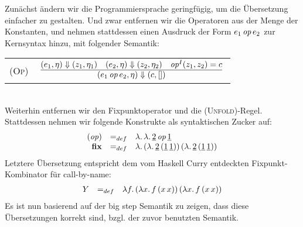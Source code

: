 \documentclass[12pt,fleqn]{article}
\newcommand{\RN}[1]{\mbox{\textsc{(#1)}}}
\begin{document}
Zun\"achst \"andern wir die Programmiersprache geringf\"ugig, um die \"Ubersetzung einfacher zu gestalten. Und
zwar entfernen wir die Operatoren aus der Menge der Konstanten, und nehmen stattdessen einen Ausdruck der
Form $e_1\,{\text{\it op\/}}\,e_2$ zur Kernsyntax hinzu, mit folgender Semantik: \\[5mm]
\begin{tabular}{ll}
  \RN{Op} & $\regel{(e_1,\eta) \Downarrow (z_1,\eta_1) \quad (e_2,\eta) \Downarrow (z_2,\eta_2)
                    \quad \op^I(z_1,z_2)=c}
                   {(e_1\,\op\,e_2,\eta) \Downarrow (c,[])}$
\end{tabular} \\[5mm]
Weiterhin entfernen wir den Fixpunktoperator und die \RN{Unfold}-Regel. Stattdessen nehmen wir folgende
Konstrukte als syntaktischen Zucker auf:
\[\begin{array}{rcl}
  ({\text{\it op\/}}) &=_{def}& \lambda .\,\lambda .\,\underline{2}\,{\text{\it op\/}}\,\underline{1} \\
  \mathbf{fix} &=_{def}& \lambda .\,(\lambda .\,\underline{2}\,(\underline{1}\,\underline{1}))\,(\lambda .\,\underline{2}\,(\underline{1}\,\underline{1}))
\end{array}\]
Letztere \"Ubersetzung entspricht dem vom Haskell Curry entdeckten Fixpunkt-Kombinator f\"ur call-by-name:
\[\begin{array}{rcl}
  Y &=_{def}& \lambda f.\,(\lambda x.\,f\,(x\,x))\,(\lambda x.\,f\,(x\,x))
\end{array}\]
Es ist nun basierend auf der big step Semantik zu zeigen, dass diese \"Ubersetzungen korrekt sind, bzgl. der
zuvor benutzten Semantik.
\end{document}
